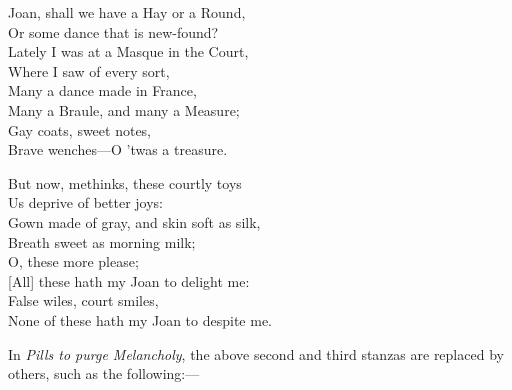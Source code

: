 

\pagebreak

\settowidth{\versewidth}{Joan, shall we have a Hay or a Round,}
\begin{dcverse}\footnotesizerr
\begin{patverse}
Joan, shall we have a Hay or a Round,\\
Or some dance that is new-found?\\
Lately I was at a Masque in the Court,\\
Where I saw of every sort,\\
Many a dance made in France,\\
Many a Braule, and many a Measure;\\
Gay coats, sweet notes,\\
Brave wenches—O ’twas a treasure.
\end{patverse}


But now, methinks, these courtly toys\\
Us deprive of better joys:\\
Gown made of gray, and skin soft as silk,\\
Breath sweet as morning milk;\\
O, these more please;\\
{[All]} these hath my Joan to delight me:\\
\vin False wiles, court smiles,\\
None of these hath my Joan to despite me.

\end{dcverse}

In \textit{ Pills to purge Melancholy}, the above second and third stanzas are replaced
by others, such as the following:—

